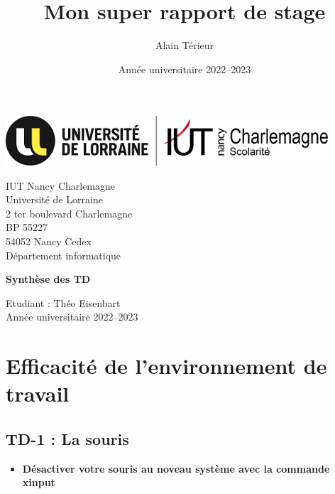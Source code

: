 \documentclass[12pt]{article}
\title{Mon super rapport de stage}
\author{Alain Térieur}
\date{Année universitaire 2022--2023}
\begin{document}
  \thispagestyle{empty}
  \begin{center}
    \includegraphics[width=12cm]{Logo_IUT-UL_dept_info.png}
  \end{center}

  \vspace{1cm}

  \noindent
  {\large
    IUT Nancy Charlemagne\\
    Université de Lorraine\\
    2 ter boulevard Charlemagne\\
    BP 55227\\
    54052 Nancy Cedex\\[5mm]
    Département informatique
  }

  \vspace{5cm}

  \begin{center}
    {\huge
      \textbf{Synthèse des TD}
    }
  \end{center}

  \vspace{5cm}

  \vfill

  {\Large
    \noindent
    Etudiant : Théo Eisenbart\\
    Année universitaire 2022--2023
  }
  \newpage
  \thispagestyle{empty}
  \mbox{}
  \newpage

  \newpage
  \tableofcontents

  \newpage

  \section{Efficacité de l'environnement de travail}

    \subsection{TD-1 : La souris}
    \vspace{0.3cm}

  \begin{itemize}
    \item \textbf{Désactiver votre souris au noveau système avec la commande xinput}
  \end{itemize}
\end{document}
